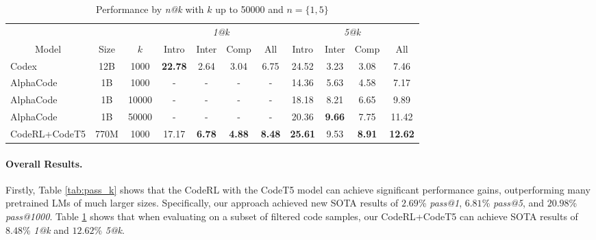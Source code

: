 \documentclass{article}
\begin{document}
\begin{table}[t]
\begin{subtable}[htbp]{1.0\textwidth}
\centering
\caption{Performance by \emph{n@k} with $k$ up to 50000 and $n=\{1,5\}$}
\label{tab:n_pass_k}
\resizebox{1.0\textwidth}{!} {
\begin{tabular}{lcc|cccc|cccc}
\hline
\multicolumn{1}{c}{}                        &                        &                     & \multicolumn{4}{c|}{\emph{1@k}}                                        & \multicolumn{4}{c}{\emph{5@k}}                                         \\
\cline{4-11}
\multicolumn{1}{c}{\multirow{-2}{*}{Model}} & \multirow{-2}{*}{Size} & \multirow{-2}{*}{$k$} & Intro          & Inter         & Comp          & All           & Intro          & Inter         & Comp          & All            \\
\hline
Codex                                       & 12B                    & 1000                & \textbf{22.78} & 2.64          & 3.04          & 6.75          & 24.52          & 3.23          & 3.08          & 7.46           \\
AlphaCode                                   & 1B                     & 1000                & -              & -             & -             & -             & 14.36          & 5.63          & 4.58          & 7.17           \\
AlphaCode                                   & 1B                     & 10000               & -              & -             & -             & -             & 18.18          & 8.21          & 6.65          & 9.89           \\
AlphaCode                                   & 1B                     & 50000               & -              & -             & -             & -             & 20.36          & \textbf{9.66} & 7.75          & 11.42          \\
\hline


CodeRL+CodeT5                                 & 770M                   & 1000                & 17.17 &	\textbf{6.78} &	 \textbf{4.88}	 & \textbf{8.48}	 & \textbf{25.61}	 &9.53	 &\textbf{8.91}	 & \textbf{12.62}   \\


\hline
\end{tabular}
}
\end{subtable}
\end{table} 
\paragraph{Overall Results.}
Firstly, Table \ref{tab:pass_k} shows that the CodeRL with the CodeT5 model can achieve significant performance gains, outperforming many pretrained LMs of much larger sizes. 
Specifically, our approach achieved new SOTA results of $2.69$\% \emph{pass@1}, $6.81$\% \emph{pass@5}, and $20.98$\% \emph{pass@1000}.
Table \ref{tab:n_pass_k} shows that 
when evaluating on a subset of filtered code samples, our CodeRL+CodeT5 can achieve SOTA results of $8.48$\% \emph{1@k} and $12.62$\% \emph{5@k}. 
\end{document}
